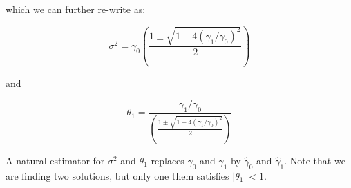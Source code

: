 \documentclass[12] {article}
\begin{document}
\noindent which we can further re-write as:

\[ \sigma^2 = \gamma_0 \left( \frac{1 \pm \sqrt{1 - 4 (\gamma_1/\gamma_0)^2}}{2} \right) \]

\noindent and 

\[ \theta_1 = \frac{\gamma_1/\gamma_0}{\left( \frac{1 \pm \sqrt{1 - 4 (\gamma_1/\gamma_0)^2}}{2} \right)} \]

\noindent A natural estimator for $\sigma^2$ and $\theta_1$ replaces $\gamma_0$ and $\gamma_1$ by $\widehat{\gamma}_0$ and $\widehat{\gamma}_1$. Note that we are finding two solutions, but only  one them satisfies $|\theta_1| < 1$.\\









 








 
 
\end{document}
